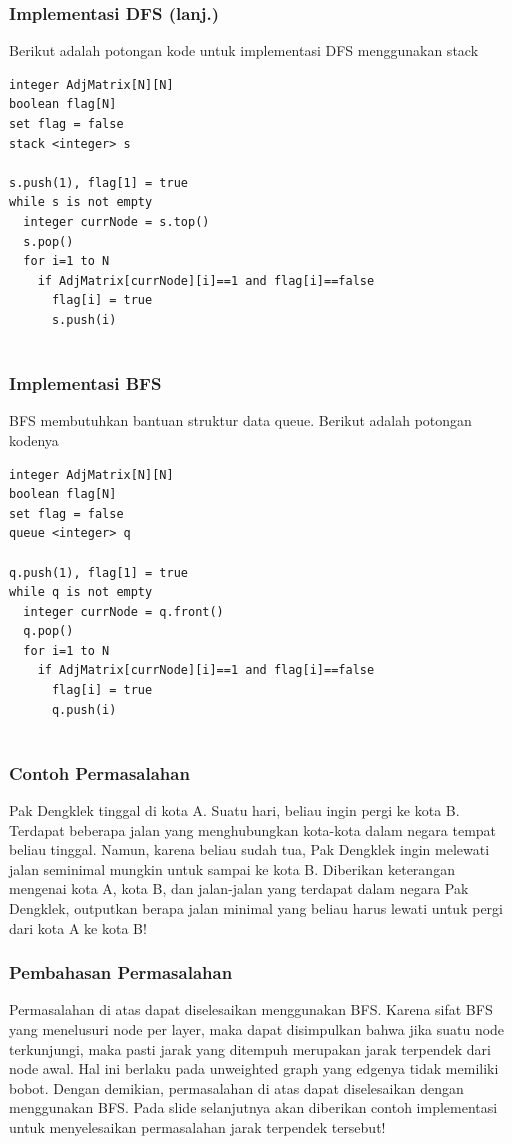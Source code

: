 \begin{frame}[fragile]
\frametitle{Implementasi DFS (lanj.)}
Berikut adalah potongan kode untuk implementasi DFS menggunakan stack\newline
\begin{lstlisting}
integer AdjMatrix[N][N]
boolean flag[N]
set flag = false
stack <integer> s

s.push(1), flag[1] = true
while s is not empty
  integer currNode = s.top()
  s.pop()
  for i=1 to N
    if AdjMatrix[currNode][i]==1 and flag[i]==false
      flag[i] = true
      s.push(i)
        
\end{lstlisting}
\end{frame}

\begin{frame}[fragile]
\frametitle{Implementasi BFS}
BFS membutuhkan bantuan struktur data queue. Berikut adalah potongan kodenya\newline
\begin{lstlisting}
integer AdjMatrix[N][N]
boolean flag[N]
set flag = false
queue <integer> q

q.push(1), flag[1] = true
while q is not empty
  integer currNode = q.front()
  q.pop()
  for i=1 to N
    if AdjMatrix[currNode][i]==1 and flag[i]==false
      flag[i] = true
      q.push(i)
        
\end{lstlisting}
\end{frame}

\begin{frame}
\frametitle{Contoh Permasalahan}
Pak Dengklek tinggal di kota A. Suatu hari, beliau ingin pergi ke kota B. Terdapat beberapa jalan yang menghubungkan kota-kota dalam negara tempat beliau tinggal. Namun, karena beliau sudah tua, Pak Dengklek ingin melewati jalan seminimal mungkin untuk sampai ke kota B.
\newline\newline
Diberikan keterangan mengenai kota A, kota B, dan jalan-jalan yang terdapat dalam negara Pak Dengklek, outputkan berapa jalan minimal yang beliau harus lewati untuk pergi dari kota A ke kota B!
\end{frame}

\begin{frame}
\frametitle{Pembahasan Permasalahan}
Permasalahan di atas dapat diselesaikan menggunakan BFS. Karena sifat BFS yang menelusuri node per layer, maka dapat disimpulkan bahwa jika suatu node terkunjungi, maka pasti jarak yang ditempuh merupakan jarak terpendek dari node awal. Hal ini berlaku pada unweighted graph yang edgenya tidak memiliki bobot.
\newline\newline
Dengan demikian, permasalahan di atas dapat diselesaikan dengan menggunakan BFS. Pada slide selanjutnya akan diberikan contoh implementasi untuk menyelesaikan permasalahan jarak terpendek tersebut!
\end{frame}

